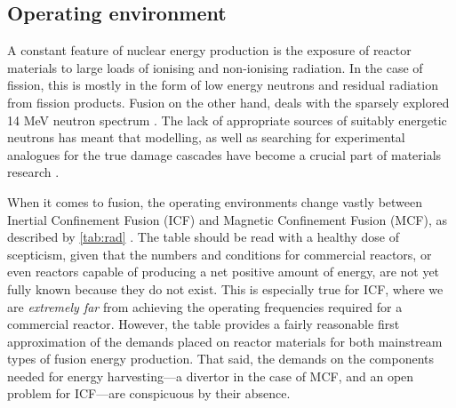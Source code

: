 \subsection{Operating environment}
\label{ss:operating_env}

A constant feature of nuclear energy production is the exposure of reactor materials to large loads of ionising and non-ionising radiation. In the case of fission, this is mostly in the form of low energy neutrons and residual radiation from fission products. Fusion on the other hand, deals with the sparsely explored 14 MeV neutron spectrum \cite{mats_fis_fus}. The lack of appropriate sources of suitably energetic neutrons \cite{ifmif} has meant that modelling, as well as searching for experimental analogues for the true damage cascades have become a crucial part of materials research \cite{fusmat1s}.

When it comes to fusion, the operating environments change vastly between Inertial Confinement Fusion (ICF) and Magnetic Confinement Fusion (MCF), as described by \cref{tab:rad} \cite{openv}. The table should be read with a healthy dose of scepticism, given that the numbers and conditions for commercial reactors, or even reactors capable of producing a net positive amount of energy, are not yet fully known because they do not exist. This is especially true for ICF, where we are \emph{extremely far} from achieving the operating frequencies required for a commercial reactor. However, the table provides a fairly reasonable first approximation of the demands placed on reactor materials for both mainstream types of fusion energy production. That said, the demands on the components needed for energy harvesting---a divertor in the case of MCF, and an open problem for ICF---are conspicuous by their absence.

